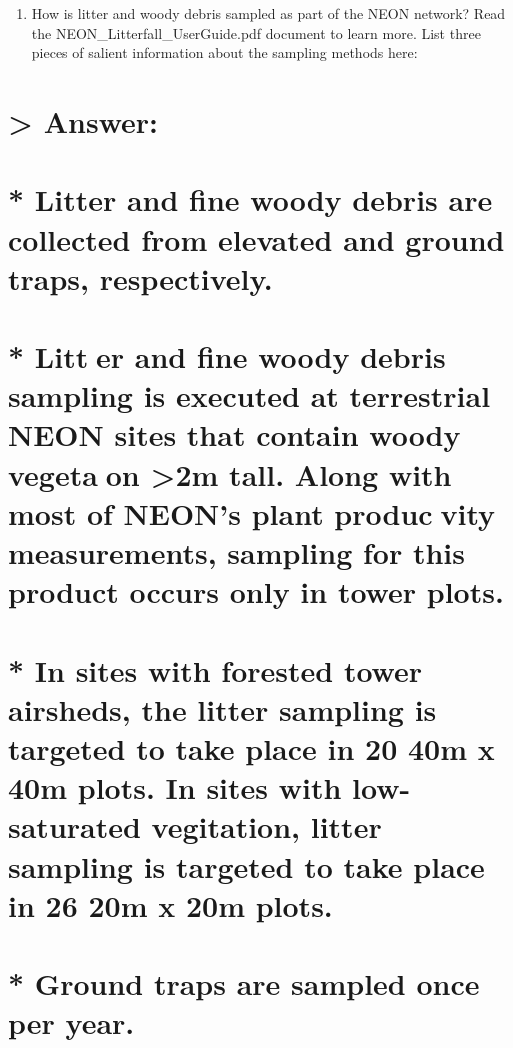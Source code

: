 \documentclass[]{article}
\providecommand{\tightlist}{%
  \setlength{\itemsep}{0pt}\setlength{\parskip}{0pt}}
\begin{document}
\begin{enumerate}
\def\labelenumi{\arabic{enumi}.}
\setcounter{enumi}{3}
\tightlist
\item
  How is litter and woody debris sampled as part of the NEON network?
  Read the NEON\_Litterfall\_UserGuide.pdf document to learn more. List
  three pieces of salient information about the sampling methods here:
\end{enumerate}

\section{\textgreater{} Answer:}\label{answer}

\section{* Litter and fine woody debris are collected from elevated and
ground traps,
respectively.}\label{litter-and-fine-woody-debris-are-collected-from-elevated-and-ground-traps-respectively.}

\section{* Litt􏰀er and fine woody debris sampling is executed at
terrestrial NEON sites that contain woody vegeta􏰁on \textgreater{}2m
tall. Along with most of NEON's plant produc􏰁vity measurements, sampling
for this product occurs only in tower
plots.}\label{litter-and-fine-woody-debris-sampling-is-executed-at-terrestrial-neon-sites-that-contain-woody-vegetaon-2m-tall.-along-with-most-of-neons-plant-producvity-measurements-sampling-for-this-product-occurs-only-in-tower-plots.}

\section{* In sites with forested tower airsheds, the litter sampling is
targeted to take place in 20 40m x 40m plots. In sites with
low-saturated vegitation, litter sampling is targeted to take place in
26 20m x 20m
plots.}\label{in-sites-with-forested-tower-airsheds-the-litter-sampling-is-targeted-to-take-place-in-20-40m-x-40m-plots.-in-sites-with-low-saturated-vegitation-litter-sampling-is-targeted-to-take-place-in-26-20m-x-20m-plots.}

\section{* Ground traps are sampled once per
year.}\label{ground-traps-are-sampled-once-per-year.}
\end{document}
